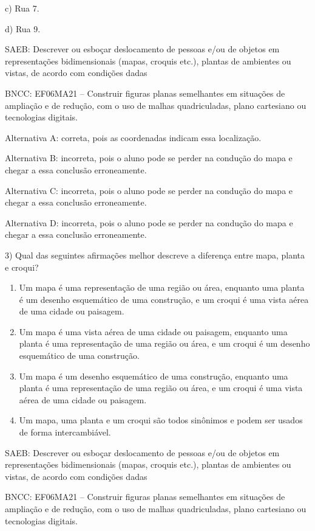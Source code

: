 c) Rua 7.

d) Rua 9.

SAEB: Descrever ou esboçar deslocamento de pessoas e/ou de objetos em
representações bidimensionais (mapas, croquis etc.), plantas de
ambientes ou vistas, de acordo com condições dadas

BNCC: EF06MA21 -- Construir figuras planas semelhantes em situações de
ampliação e de redução, com o uso de malhas quadriculadas, plano
cartesiano ou tecnologias digitais.

Alternativa A: correta, pois as coordenadas indicam essa localização.

Alternativa B: incorreta, pois o aluno pode se perder na condução do
mapa e chegar a essa conclusão erroneamente.

Alternativa C: incorreta, pois o aluno pode se perder na condução do
mapa e chegar a essa conclusão erroneamente.

Alternativa D: incorreta, pois o aluno pode se perder na condução do
mapa e chegar a essa conclusão erroneamente.

3) Qual das seguintes afirmações melhor descreve a diferença entre mapa,
planta e croqui?

\begin{enumerate}
\def\labelenumi{\alph{enumi})}
\item
  Um mapa é uma representação de uma região ou área, enquanto uma planta
  é um desenho esquemático de uma construção, e um croqui é uma vista
  aérea de uma cidade ou paisagem.
\item
  Um mapa é uma vista aérea de uma cidade ou paisagem, enquanto uma
  planta é uma representação de uma região ou área, e um croqui é um
  desenho esquemático de uma construção.
\item
  Um mapa é um desenho esquemático de uma construção, enquanto uma
  planta é uma representação de uma região ou área, e um croqui é uma
  vista aérea de uma cidade ou paisagem.
\item
  Um mapa, uma planta e um croqui são todos sinônimos e podem ser usados
  de forma intercambiável.
\end{enumerate}

SAEB: Descrever ou esboçar deslocamento de pessoas e/ou de objetos em
representações bidimensionais (mapas, croquis etc.), plantas de
ambientes ou vistas, de acordo com condições dadas

BNCC: EF06MA21 -- Construir figuras planas semelhantes em situações de
ampliação e de redução, com o uso de malhas quadriculadas, plano
cartesiano ou tecnologias digitais.


